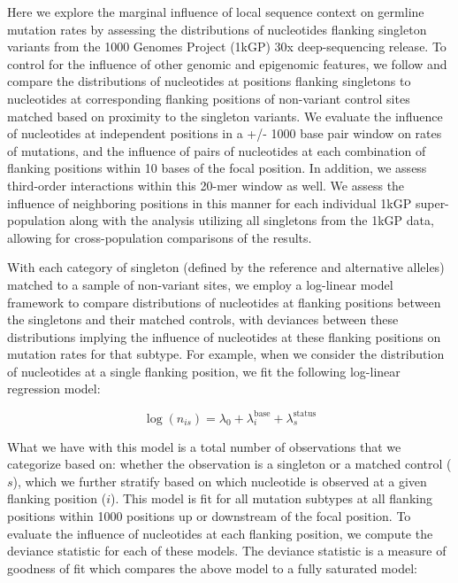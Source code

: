 Here we explore the marginal influence of local sequence context on germline mutation rates by assessing the distributions of nucleotides flanking singleton variants from the 1000 Genomes Project (1kGP) 30x deep-sequencing release. To control for the influence of other genomic and epigenomic features, we follow \citep{Zhu2017} and compare the distributions of nucleotides at positions flanking singletons to nucleotides at corresponding flanking positions of non-variant control sites matched based on proximity to the singleton variants. We evaluate the influence of nucleotides at independent positions in a +/- 1000 base pair window on rates of mutations, and the influence of pairs of nucleotides at each combination of flanking positions within 10 bases of the focal position. In addition, we assess third-order interactions within this 20-mer window as well. We assess the influence of neighboring positions in this manner for each individual 1kGP super-population along with the analysis utilizing all singletons from the 1kGP data, allowing for cross-population comparisons of the results.

With each category of singleton (defined by the reference and alternative alleles) matched to a sample of non-variant sites, we employ a log-linear model framework to compare distributions of nucleotides at flanking positions between the singletons and their matched controls, with deviances between these distributions implying the influence of nucleotides at these flanking positions on mutation rates for that subtype. For example, when we consider the distribution of nucleotides at a single flanking position, we fit the following log-linear regression model:

\begin{equation}
    \log(n_{is}) = \lambda_0 + \lambda_{i}^{\textrm{base}} + \lambda_{s}^{\textrm{status}} 
\end{equation}

What we have with this model is a total number of observations that we categorize based on: whether the observation is a singleton or a matched control ($s$), which we further stratify based on which nucleotide is observed at a given flanking position ($i$). This model is fit for all mutation subtypes at all flanking positions within 1000 positions up or downstream of the focal position.
To evaluate the influence of nucleotides at each flanking position, we compute the deviance statistic for each of these models. The deviance statistic is a measure of goodness of fit which compares the above model to a fully saturated model:

